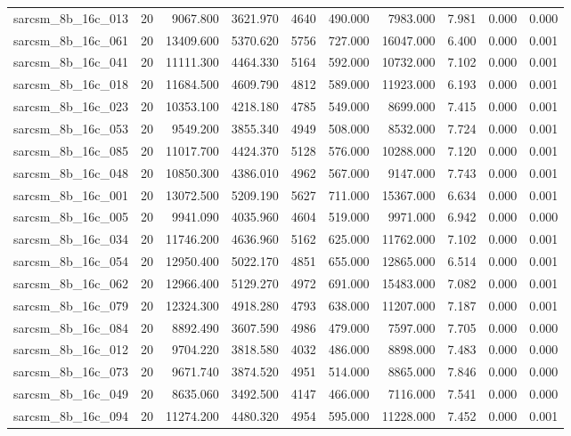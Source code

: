 \begin{tabular}{lrrrrrrrrr}
sarcsm\_8b\_16c\_013 & 20 & 9067.800 & 3621.970 & 4640 & 490.000 & 7983.000 & 7.981 & 0.000 & 0.000 \\
sarcsm\_8b\_16c\_061 & 20 & 13409.600 & 5370.620 & 5756 & 727.000 & 16047.000 & 6.400 & 0.000 & 0.001 \\
sarcsm\_8b\_16c\_041 & 20 & 11111.300 & 4464.330 & 5164 & 592.000 & 10732.000 & 7.102 & 0.000 & 0.001 \\
sarcsm\_8b\_16c\_018 & 20 & 11684.500 & 4609.790 & 4812 & 589.000 & 11923.000 & 6.193 & 0.000 & 0.001 \\
sarcsm\_8b\_16c\_023 & 20 & 10353.100 & 4218.180 & 4785 & 549.000 & 8699.000 & 7.415 & 0.000 & 0.001 \\
sarcsm\_8b\_16c\_053 & 20 & 9549.200 & 3855.340 & 4949 & 508.000 & 8532.000 & 7.724 & 0.000 & 0.001 \\
sarcsm\_8b\_16c\_085 & 20 & 11017.700 & 4424.370 & 5128 & 576.000 & 10288.000 & 7.120 & 0.000 & 0.001 \\
sarcsm\_8b\_16c\_048 & 20 & 10850.300 & 4386.010 & 4962 & 567.000 & 9147.000 & 7.743 & 0.000 & 0.001 \\
sarcsm\_8b\_16c\_001 & 20 & 13072.500 & 5209.190 & 5627 & 711.000 & 15367.000 & 6.634 & 0.000 & 0.001 \\
sarcsm\_8b\_16c\_005 & 20 & 9941.090 & 4035.960 & 4604 & 519.000 & 9971.000 & 6.942 & 0.000 & 0.000 \\
sarcsm\_8b\_16c\_034 & 20 & 11746.200 & 4636.960 & 5162 & 625.000 & 11762.000 & 7.102 & 0.000 & 0.001 \\
sarcsm\_8b\_16c\_054 & 20 & 12950.400 & 5022.170 & 4851 & 655.000 & 12865.000 & 6.514 & 0.000 & 0.001 \\
sarcsm\_8b\_16c\_062 & 20 & 12966.400 & 5129.270 & 4972 & 691.000 & 15483.000 & 7.082 & 0.000 & 0.001 \\
sarcsm\_8b\_16c\_079 & 20 & 12324.300 & 4918.280 & 4793 & 638.000 & 11207.000 & 7.187 & 0.000 & 0.001 \\
sarcsm\_8b\_16c\_084 & 20 & 8892.490 & 3607.590 & 4986 & 479.000 & 7597.000 & 7.705 & 0.000 & 0.000 \\
sarcsm\_8b\_16c\_012 & 20 & 9704.220 & 3818.580 & 4032 & 486.000 & 8898.000 & 7.483 & 0.000 & 0.000 \\
sarcsm\_8b\_16c\_073 & 20 & 9671.740 & 3874.520 & 4951 & 514.000 & 8865.000 & 7.846 & 0.000 & 0.000 \\
sarcsm\_8b\_16c\_049 & 20 & 8635.060 & 3492.500 & 4147 & 466.000 & 7116.000 & 7.541 & 0.000 & 0.000 \\
sarcsm\_8b\_16c\_094 & 20 & 11274.200 & 4480.320 & 4954 & 595.000 & 11228.000 & 7.452 & 0.000 & 0.001 \\

\end{tabular}
